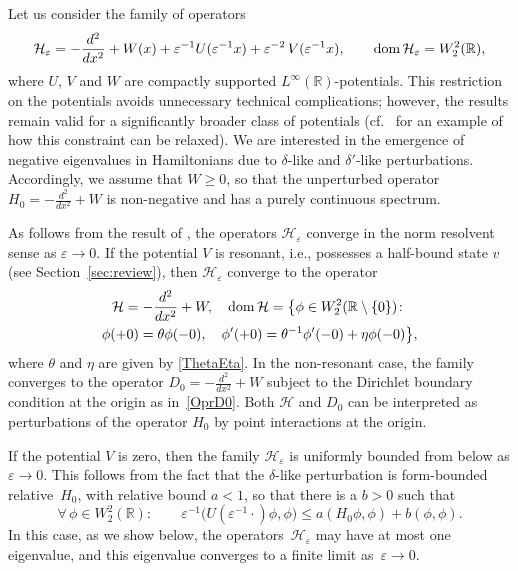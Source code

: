 \documentclass[reqno]{amsart}
\theoremstyle{definition}
\theoremstyle{remark}
\numberwithin{equation}{section}
\newcommand{\dmn}{\mathop{\rm dom}}
\newcommand{\Real}{\mathbb R}
\newcommand{\eps}{\varepsilon}
\newcommand{\cH}{\mathcal{H}}
\begin{document}
Let us consider the family of operators
\begin{equation}\label{Heps}
 \cH_\eps= -\frac{d^2}{dx^2}+W(x)+ \eps^{-1} U(\eps^{-1}x)+\eps^{-2}\,V(\eps^{-1}x), \qquad \dmn \cH_\eps=W^2_2(\Real),
\end{equation}
where $U$, $V$ and $W$ are compactly supported $L^\infty(\Real)$-potentials. This restriction on the potentials avoids unnecessary technical complications; however, the results remain valid for a significantly broader class of potentials  (cf.~\cite{GolovatyHrynivProcEdinburgh2013} for an example of how this constraint can be relaxed). We are interested in the emergence of negative eigenvalues in Hamiltonians due to $\delta$-like and $\delta'$-like perturbations. Accordingly, we assume that $W \ge 0$, so that the unperturbed operator $H_0 = -\frac{d^2}{dx^2} + W$ is non-negative and has a purely continuous spectrum.


As follows from the result of \cite{GolovatyMFAT2012}, the operators $\cH_\eps$ converge in the norm resolvent sense as $\eps\to0$. If the potential $V$ is resonant, i.e., possesses a half-bound state $v$ (see Section~\ref{sec:review}), then $\cH_\eps$ converge to the operator
\begin{multline}\label{Hthetaeta}
  \cH=-\frac{d^2}{dx^2}+W, \quad \dmn \cH=\big\{\phi\in W^2_2(\Real\setminus\{0\})\colon \\
  \phi(+0)=\theta\phi(-0), \quad\phi'(+0)=\theta^{-1}\phi'(-0)+\eta \phi(-0)\big\},
\end{multline}
where $\theta$ and $\eta$ are given by \eqref{ThetaEta}.
In the non-resonant case, the family converges to the operator $D_0 = -\frac{d^2}{dx^2} + W$ subject to the Dirichlet boundary condition at the origin as in~\eqref{OprD0}. Both $\cH$ and $D_0$ can be interpreted as perturbations of the operator $H_0$ by point interactions at the origin.

If the potential $V$ is zero, then the family $\cH_\eps$  is uniformly bounded from below as $\eps\to 0$. This follows from the fact that the $\delta$-like perturbation is   form-bounded relative~$H_0$, with relative bound $a<1$, so that there is a $b>0$ such that
\begin{equation*}
 \forall\,\phi\in W^2_2(\Real): \qquad  \eps^{-1}\big(U(\eps^{-1}\cdot)\phi,\phi\big)\le a(H_0\phi,\phi)+b(\phi,\phi).
\end{equation*}
In this case, as we show below, the operators~$\cH_\eps$ may have at most one eigenvalue, and this eigenvalue converges to a finite limit as~$\eps\to 0$.
\end{document}
